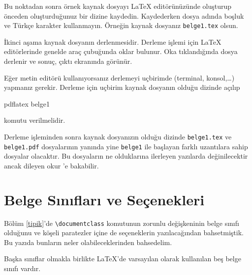 \documentclass[
  10pt,
]{scrbook}
\newenvironment{Shaded}{\begin{snugshade}}{\end{snugshade}}
\newcommand{\ExtensionTok}[1]{#1}
\newcommand{\NormalTok}[1]{#1}
\theoremstyle{definition}
\theoremstyle{definition}
\theoremstyle{definition}
\theoremstyle{definition}
\theoremstyle{remark}
\begin{document}
Bu noktadan sonra örnek kaynak dosyayı LaTeX editörünüzünde oluşturup önceden oluşturduğunuz bir dizine kaydedin. Kaydederken dosya adında boşluk ve Türkçe karakter kullanmayın. Örneğin kaynak dosyanız \texttt{belge1.tex} olsun.

İkinci aşama kaynak dosyanın derlenmesidir. Derleme işlemi için LaTeX editörlerinde genelde araç çubuğunda oklar bulunur. Oka tıklandığında dosya derlenir ve sonuç, çıktı ekranında görünür.

Eğer metin editörü kullanıyorsanız derlemeyi uçbirimde (terminal, konsol,\ldots) yapmanız gerekir. Derleme için uçbirim kaynak dosyanın olduğu dizinde açılıp

\begin{Shaded}
\begin{Highlighting}[]
\ExtensionTok{pdflatex}\NormalTok{ belge1}
\end{Highlighting}
\end{Shaded}

komutu verilmelidir.

Derleme işleminden sonra kaynak dosyanızın olduğu dizinde \texttt{belge1.tex} ve \texttt{belge1.pdf} dosyalarının yanında yine \texttt{belge1} ile başlayan farklı uzantılara sahip dosyalar olacaktır. Bu dosyaların ne olduklarına ilerleyen yazılarda değinilecektir ancak dileyen okur \citep[s. 13-14]{Oetiker}'e bakabilir.

\hypertarget{belgesinifi}{%
\section{Belge Sınıfları ve Seçenekleri}\label{belgesinifi}}

Bölüm \ref{tipik}'de \texttt{\textbackslash{}documentclass} komutunun zorunlu değişkeninin belge sınıfı olduğunu ve köşeli paratezler içine de seçeneklerin yazılacağından bahsetmiştik. Bu yazıda bunların neler olabileceklerinden bahsedelim.

Başka sınıflar olmakla birlikte LaTeX'de varsayılan olarak kullanılan beş belge sınıfı vardır.
\end{document}
